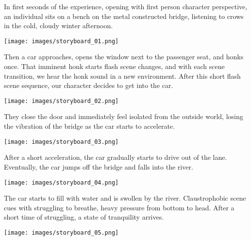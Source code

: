         In first seconds of the experience, opening with first person character perspective, an individual sits on a bench on the metal constructed bridge, listening to crows in the cold, cloudy winter afternoon.\par
 
        \begin{center}
            \texttt{[image: images/storyboard\_01.png]}
        \end{center}

        Then a car approaches, opens the window next to the passenger seat, and honks once. That imminent honk starts flash scene changes, and with each scene transition, we hear the honk sound in a new environment. After this short flash scene sequence, our character decides to get into the car.\par


        \begin{center}
            \texttt{[image: images/storyboard\_02.png]}
        \end{center}


        They close the door and immediately feel isolated from the outside world, losing the vibration of the bridge as the car starts to accelerate.\par

        \begin{center}
            \texttt{[image: images/storyboard\_03.png]}
        \end{center}

        After a short acceleration, the car gradually starts to drive out of the lane. Eventually, the car jumps off the bridge and falls into the river.\par

        \begin{center}
            \texttt{[image: images/storyboard\_04.png]}
        \end{center}

        The car starts to fill with water and is swollen by the river. Claustrophobic scene cues with struggling to breathe, heavy pressure from bottom to head. After a short time of struggling, a state of tranquility arrives.\par

        \begin{center}
            \texttt{[image: images/storyboard\_05.png]}
        \end{center}

